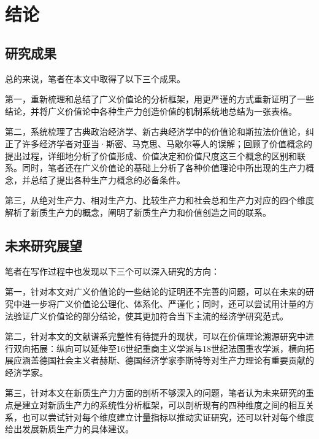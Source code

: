 
\chapter{结论}

\section{研究成果}

总的来说，笔者在本文中取得了以下三个成果。

第一，重新梳理和总结了广义价值论的分析框架，用更严谨的方式重新证明了一些结论，并将广义价值论中各种生产力创造价值的机制系统地总结为一张表格。

第二，系统梳理了古典政治经济学、新古典经济学中的价值论和斯拉法价值论，纠正了许多经济学者对亚当·斯密、马克思、马歇尔等人的误解；回顾了价值概念的提出过程，详细地分析了价值形成、价值决定和价值尺度这三个概念的区别和联系。同时，笔者还在广义价值论的基础上分析了各种价值理论中所出现的生产力概念，并总结了提出各种生产力概念的必备条件。

第三，从绝对生产力、相对生产力、比较生产力和社会总和生产力对应的四个维度解析了新质生产力的概念，阐明了新质生产力和价值创造之间的联系。

\section{未来研究展望}

笔者在写作过程中也发现以下三个可以深入研究的方向：

第一，针对本文对广义价值论的一些结论的证明还不完善的问题，可以在未来的研究中进一步将广义价值论公理化、体系化、严谨化；同时，还可以尝试用计量的方法验证广义价值论的部分结论，使其更加符合当下主流的经济学研究范式。

第二，针对本文的文献谱系完整性有待提升的现状，可以在价值理论溯源研究中进行双向拓展：纵向可以延伸至16世纪重商主义学派与18世纪法国重农学派，横向拓展应涵盖德国社会主义者赫斯、德国经济学家李斯特\cite[33]{YangQiaoYuShengChanLiGaiNianCongSiMiDaoMaKeSiDeSiXiangPuXi2013}等对生产力理论有重要贡献的经济学家。

第三，针对本文在新质生产力方面的剖析不够深入的问题，笔者认为未来研究的重点是建立对新质生产力的系统性分析框架，可以剖析现有的四种维度之间的相互关系，也可以尝试针对每个维度建立计量指标以推动实证研究，还可以针对每个维度给出发展新质生产力的具体建议。
